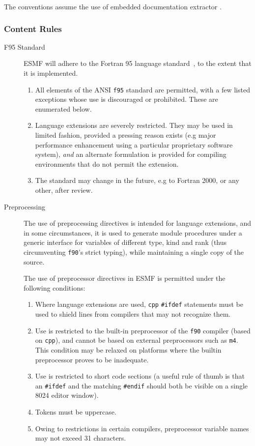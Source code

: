 The conventions assume the use of embedded documentation extractor
.

\subsubsection{Content Rules}

\begin{description}

\item[F95 Standard] ESMF will adhere to the Fortran 95 language
  standard~\cite{ref:f95}, to the extent that it is implemented.

\begin{enumerate}
\item All elements of the ANSI \texttt{f95} standard are permitted,
  with a few listed exceptions whose use is discouraged or prohibited.
  These are enumerated below.
\item Language extensions are severely restricted. They may be used in
  limited fashion, provided a pressing reason exists (e.g major
  performance enhancement using a particular proprietary software
  system), \emph{and} an alternate formulation is provided for compiling
  environments that do not permit the extension.
\item The standard may change in the future, e.g to Fortran 2000, or
  any other, after review.
\end{enumerate}
  
\item[Preprocessing] The use of preprocessing directives is intended
  for language extensions, and in some circumstances, it is used to
  generate module procedures under a generic interface for variables
  of different type, kind and rank (thus circumventing \texttt{f90}'s
  strict typing), while maintaining a single copy of the source.

The use of preprocessor directives in ESMF is permitted under the
following conditions:

\begin{enumerate}
\item Where language extensions are used, \texttt{cpp}
  \texttt{\#ifdef} statements must be used to shield lines from
  compilers that may not recognize them.
\item Use is restricted to the built-in preprocessor of the
  \texttt{f90} compiler (based on \texttt{cpp}), and cannot be based
  on external preprocessors such as \texttt{m4}. This condition may be
  relaxed on platforms where the builtin preprocessor proves to be
  inadequate.
\item Use is restricted to short code sections (a useful rule of thumb
  is that an \texttt{\#ifdef} and the matching \texttt{\#endif} should
  both be visible on a single 8024 editor
  window).
\item Tokens must be uppercase.
\item Owing to restrictions in certain compilers, preprocessor
  variable names may not exceed 31 characters.
\end{enumerate}


\end{description}
